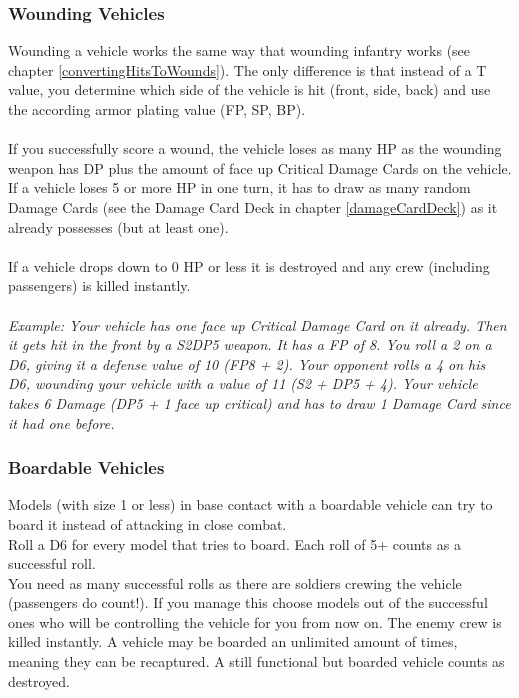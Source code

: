 \documentclass[
	11pt,
	toc=bibliography
	]{article}
\begin{document}
\subsubsection{Wounding Vehicles}
Wounding a vehicle works the same way that wounding infantry works (see chapter \ref{convertingHitsToWounds}). The only difference is that instead of a T value, you determine which side of the vehicle is hit (front, side, back) and use the according armor plating value (FP, SP, BP).\\\\
If you successfully score a wound, the vehicle loses as many HP as the wounding weapon has DP plus the amount of face up Critical Damage Cards on the vehicle. \\
If a vehicle loses 5 or more HP in one turn, it has to draw as many random Damage Cards (see the Damage Card Deck in chapter \ref{damageCardDeck}) as it already possesses (but at least one). \\\\
If a vehicle drops down to 0 HP or less it is destroyed and any crew (including passengers) is killed instantly.\\\\ 
\textit{Example: Your vehicle has one face up Critical Damage Card on it already. Then it gets hit in the front by a S2DP5 weapon. It has a FP of 8. You roll a 2 on a D6, giving it a defense value of 10 (FP8 + 2). Your opponent rolls a 4 on his D6, wounding your vehicle with a value of 11 (S2 + DP5 + 4). Your vehicle takes 6 Damage (DP5 + 1 face up critical) and has to draw 1 Damage Card since it had one before.
} 

\subsubsection{Boardable Vehicles}\label{boardableVehicles}
Models (with size 1 or less) in base contact with a boardable vehicle can try to board it instead of attacking in close combat. \\Roll a D6 for every model that tries to board. Each roll of 5+ counts as a successful roll. \\You need as many successful rolls as there are soldiers crewing the vehicle (passengers do count!). If you manage this choose models out of the successful ones who will be controlling the vehicle for you from now on. The enemy crew is killed instantly. A vehicle may be boarded an unlimited amount of times, meaning they can be recaptured. A still functional but boarded vehicle counts as destroyed.   
\newpage
{}
\end{document}
